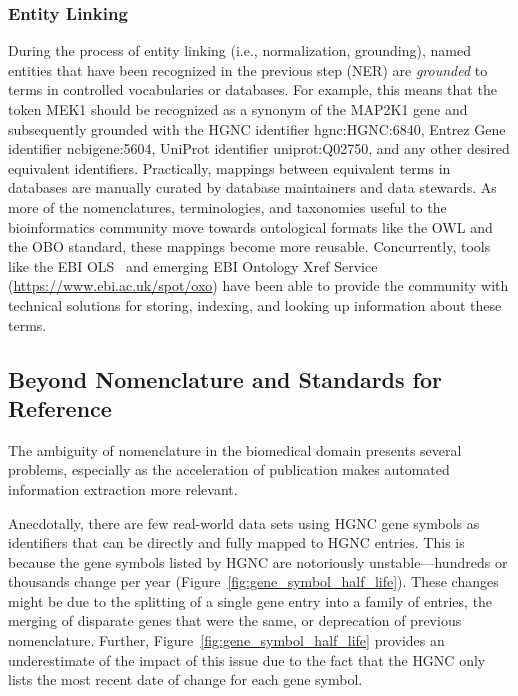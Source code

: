 \subsubsection*{Entity Linking}

During the process of entity linking (i.e., normalization, grounding), named entities that have been recognized in the previous step (\ac{NER}) are \textit{grounded} to terms in controlled vocabularies or databases.
For example, this means that the token MEK1 should be recognized as a synonym of the MAP2K1 gene and subsequently grounded with the \ac{HGNC} identifier hgnc:HGNC:6840, Entrez Gene identifier ncbigene:5604, UniProt identifier uniprot:Q02750, and any other desired equivalent identifiers.
Practically, mappings between equivalent terms in databases are manually curated by database maintainers and data stewards.
As more of the nomenclatures, terminologies, and taxonomies useful to the bioinformatics community move towards ontological formats like the \ac{OWL} and the \ac{OBO} standard, these mappings become more reusable.
Concurrently, tools like the \ac{EBI} \ac{OLS}~\cite{Cote2006} and emerging \ac{EBI} Ontology Xref Service (\url{https://www.ebi.ac.uk/spot/oxo}) have been able to provide the community with technical solutions for storing, indexing, and looking up information about these terms.

\subsection{Beyond Nomenclature and Standards for Reference}

The ambiguity of nomenclature in the biomedical domain presents several problems, especially as the acceleration of publication makes automated information extraction more relevant.

Anecdotally, there are few real-world data sets using \ac{HGNC} gene symbols as identifiers that can be directly and fully mapped to \ac{HGNC} entries.
This is because the gene symbols listed by \ac{HGNC} are notoriously unstable---hundreds or thousands change per year (Figure~\ref{fig:gene_symbol_half_life}).
These changes might be due to the splitting of a single gene entry into a family of entries, the merging of disparate genes that were the same, or deprecation of previous nomenclature.
Further, Figure~\ref{fig:gene_symbol_half_life} provides an underestimate of the impact of this issue due to the fact that the \ac{HGNC} only lists the most recent date of change for each gene symbol.

